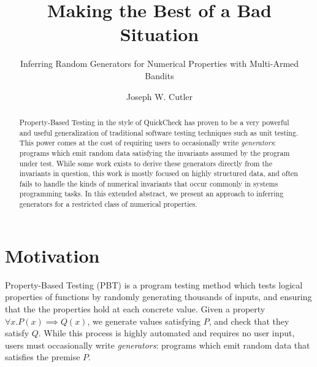 \documentclass[sigconf,nonacm,review,anonymous]{acmart}
\begin{document}
\title{Making the Best of a Bad Situation}
\subtitle{Inferring Random Generators for Numerical Properties with Multi-Armed Bandits}

\author{Joseph W. Cutler}

\renewcommand{\shortauthors}{Cutler}

\begin{abstract}
  Property-Based Testing in the style of QuickCheck has proven to be a
  very powerful and useful generalization of traditional software testing techniques
  such as unit testing. This power comes at the cost of requiring users to occasionally write \emph{generators}:
  programs which emit random data satisfying the invariants assumed by the program under test. While some work exists
  to derive these generators directly from the invariants in question, this work is mostly focused on highly structured data,
  and often fails to handle the kinds of numerical invariants that occur commonly in systems programming tasks.
  In this extended abstract, we present an approach to inferring generators for a restricted class of numerical properties.
  \vspace{-18px}
\end{abstract}


\maketitle

\section{Motivation}
Property-Based Testing (PBT) \cite{qc} is a program testing method which tests
logical properties of functions by randomly generating thousands of inputs, and ensuring that
the the properties hold at each concrete value. Given a property $\forall x. P(x) \implies Q(x)$,
we generate values satisfying $P$, and check that they satisfy $Q$.
While this process is highly automated and requires no user input, users must occasionally write \emph{generators}:
programs which emit random data that satisfies the premise $P$.
\end{document}
